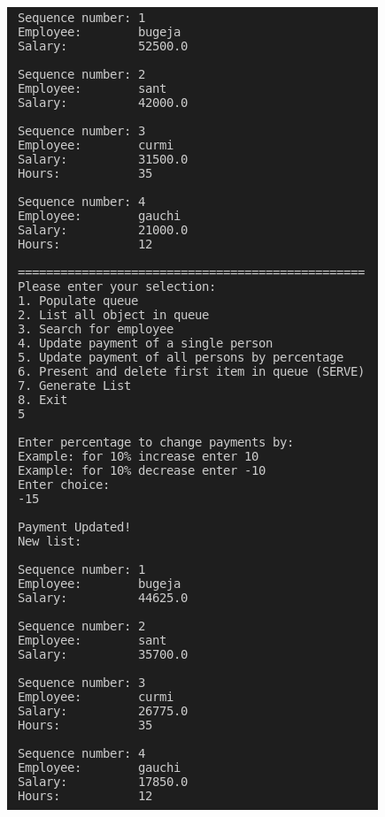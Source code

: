 \documentclass[12pt]{article}
\begin{document}
\begin{figure}[h]
\includegraphics[scale=0.45]{Images/Testing 5/2.png}
\end{figure}
\newpage
\end{document}
